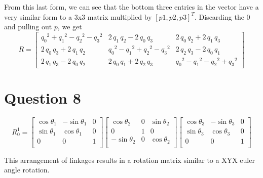 \documentclass[11pt]{article}
\begin{document}
From this last form, we can see that the bottom three entries in the vector have a 
very similar form to a 3x3 matrix multiplied by $[p1,p2,p3]^T$. Discarding the 0 and pulling out $p$, we get
$$
R = 
\begin{bmatrix}
{q_{0}}^2+{q_{1}}^2-{q_{2}}^2-{q_{3}}^2 & 2\,q_{1}\,q_{2}-2\,q_{0}\,q_{3}         & 2\,q_{0}\,q_{2}+2\,q_{1}\,q_{3}\\
2\,q_{0}\,q_{3}+2\,q_{1}\,q_{2}         & {q_{0}}^2-{q_{1}}^2+{q_{2}}^2-{q_{3}}^2 & 2\,q_{2}\,q_{3}-2\,q_{0}\,q_{1}\\
2\,q_{1}\,q_{3}-2\,q_{0}\,q_{2}         & 2\,q_{0}\,q_{1}+2\,q_{2}\,q_{3}         & {q_{0}}^2-{q_{1}}^2-{q_{2}}^2+{q_{3}}^2
\end{bmatrix} 
$$
\section{Question 8}
$$
R_0^1=
\begin{bmatrix}
    \cos{\theta_1} & -\sin{\theta_1} & 0 \\
    \sin{\theta_1} &\cos{\theta_1} & 0 \\
    0    & 0 & 1 \\
\end{bmatrix}
\begin{bmatrix}
    \cos{\theta_2} & 0 & \sin{\theta_2} \\
    0    & 1 & 0 \\
    -\sin{\theta_2} & 0 &\cos{\theta_2} \\
\end{bmatrix}
\begin{bmatrix}
    \cos{\theta_3} & -\sin{\theta_3} & 0 \\
    \sin{\theta_3} &\cos{\theta_3} & 0 \\
    0    & 0 & 1 \\
\end{bmatrix}
$$

This arrangement of linkages results in a rotation matrix similar to a XYX euler angle rotation. 
\end{document}
